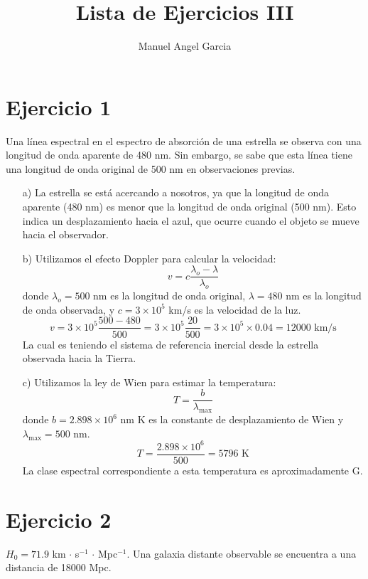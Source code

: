 \documentclass[12pt]{article}
\title{Lista de Ejercicios III}
\author{Manuel Angel Garcia}
\begin{document}
\maketitle

\section*{Ejercicio 1}

Una línea espectral en el espectro de absorción de una estrella se observa con una longitud de onda aparente de 480 nm. Sin embargo, se sabe que esta línea tiene una longitud de onda original de 500 nm en observaciones previas.

\begin{enumerate}
    \item[a)] 
      La estrella se está acercando a nosotros, ya que la longitud de onda aparente (480 nm) es menor que la longitud de onda original (500 nm). Esto indica un desplazamiento hacia el azul, que ocurre cuando el objeto se mueve hacia el observador.
    
    \item[b)] 
      Utilizamos el efecto Doppler para calcular la velocidad:
    \[
    v = c \frac{\lambda_o - \lambda}{\lambda_o}
    \]
    donde \( \lambda_o = 500 \) nm es la longitud de onda original, \( \lambda = 480 \) nm es la longitud de onda observada, y \( c = 3 \times 10^5 \) km/s es la velocidad de la luz.
    \[
    v = 3 \times 10^5 \frac{500 - 480}{500} = 3 \times 10^5 \frac{20}{500} = 3 \times 10^5 \times 0.04 = 12000 \text{ km/s}
    \]
    La cual es teniendo el sistema de referencia inercial desde la estrella observada hacia la Tierra.
    
    \item[c)] 
      Utilizamos la ley de Wien para estimar la temperatura:
    \[
    T = \frac{b}{\lambda_{\text{max}}}
    \]
    donde \( b = 2.898 \times 10^6 \) nm K es la constante de desplazamiento de Wien y \( \lambda_{\text{max}} = 500 \) nm.
    \[
    T = \frac{2.898 \times 10^6}{500} = 5796 \text{ K}
    \]
    La clase espectral correspondiente a esta temperatura es aproximadamente G.
\end{enumerate}

\section*{Ejercicio 2}

\( H_0 = 71.9 \) km $\cdot$ s\(^{-1}\) $\cdot$ Mpc\(^{-1}\). Una galaxia distante observable se encuentra a una distancia de 18000 Mpc.
\end{document}
